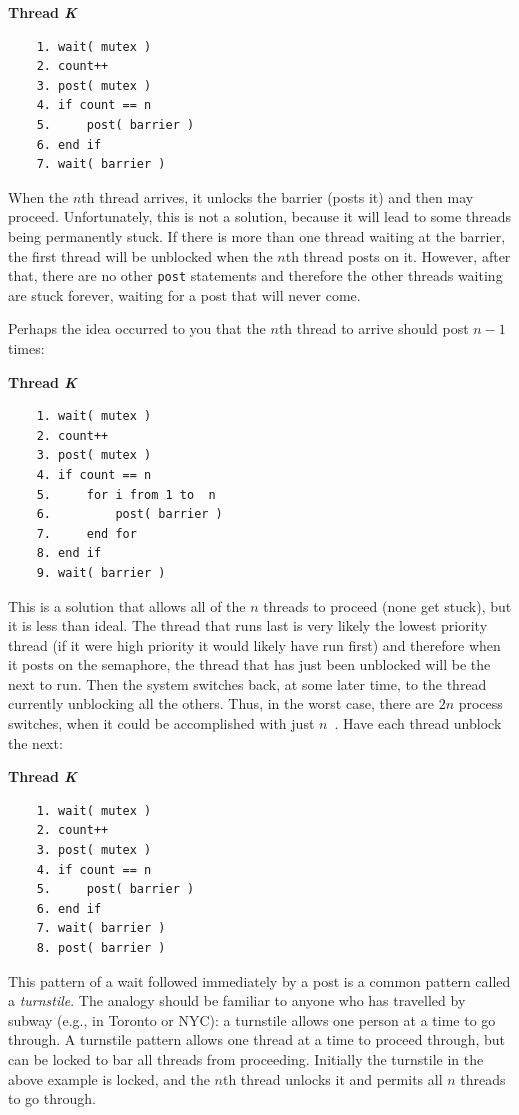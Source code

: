 \textbf{Thread \textit{K}}\vspace{-2em}
  \begin{verbatim}
	1. wait( mutex )
	2. count++
	3. post( mutex )
	4. if count == n
	5.     post( barrier )
	6. end if
	7. wait( barrier )
  \end{verbatim}
\vspace{-2em}

When the $n$th thread arrives, it unlocks the barrier (posts it) and then may proceed. Unfortunately, this is not a solution, because it will lead to some threads being permanently stuck. If there is more than one thread waiting at the barrier, the first thread will be unblocked when the $n$th thread posts on it. However, after that, there are no other \texttt{post} statements and therefore the other threads waiting are stuck forever, waiting for a post that will never come.

Perhaps the idea occurred to you that the $n$th thread to arrive should post $n-1$ times:

\textbf{Thread \textit{K}}\vspace{-2em}
  \begin{verbatim}
	1. wait( mutex )
	2. count++
	3. post( mutex )
	4. if count == n
	5.     for i from 1 to  n
	6.         post( barrier )
	7.     end for
	8. end if
	9. wait( barrier )
  \end{verbatim}
\vspace{-2em} 

This is a solution that allows all of the $n$ threads to proceed (none get stuck), but it is less than ideal. The thread that runs last is very likely the lowest priority thread (if it were high priority it would likely have run first) and therefore when it posts on the semaphore, the thread that has just been unblocked will be the next to run. Then the system switches back, at some later time, to the thread currently unblocking all the others. Thus, in the worst case, there are $2n$ process switches, when it could be accomplished with just $n$~\cite{mte241}. Have each thread unblock the next:

\textbf{Thread \textit{K}}\vspace{-2em}
  \begin{verbatim}
	1. wait( mutex )
	2. count++
	3. post( mutex )
	4. if count == n
	5.     post( barrier )
	6. end if
	7. wait( barrier )
	8. post( barrier )
  \end{verbatim}
\vspace{-2em}

This pattern of a wait followed immediately by a post is a common pattern called a \textit{turnstile}. The analogy should be familiar to anyone who has travelled by subway (e.g., in Toronto or NYC): a turnstile allows one person at a time to go through. A turnstile pattern allows one thread at a time to proceed through, but can be locked to bar all threads from proceeding. Initially the turnstile in the above example is locked, and the $n$th thread unlocks it and permits all $n$ threads to go through.

